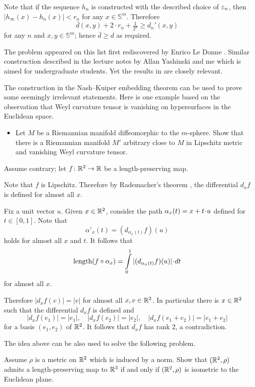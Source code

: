 Note that if the sequence $h_n$ is constructed with the described choice of $\varepsilon_n$,
then $|h_\infty(x)-h_n(x)|<r_n$ for any $x\in\mathbb{S}^m$.
Therefore 
\[\bar d(x,y)+2\cdot r_n+\tfrac1{2^n}\ge d_n'(x,y)\] 
for any $n$ and $x,y\in \mathbb{S}^m$;
hence $\bar d\ge d$ as required. 
\qeds


The problem appeared 
on this list first rediscovered by Enrico Le Donne \cite[see][]{le-donne}.
Similar construction described in the lecture notes by Allan Yashinski and me \cite[see][]{petrunin-yashinsky} 
which is aimed for undergraduate students. 
Yet the results in \cite{petrunin-paths} are closely relevant.

The construction in the Nash--Kuiper embedding theorem
can be used to prove some seemingly irrelevant statements.
Here is one example based on the observation that Weyl curvature tensor 
is vanishing on hypersurfaces in the Euclidean space.
\begin{itemize}
\item Let $M$ be a Riemannian manifold diffeomorphic to the $m$-sphere. 
Show that there is a Riemannian manifold $M'$ arbitrary close to $M$ in Lipschitz metric and vanishing Weyl curvature tensor.
\end{itemize}


Assume contrary;
let $f\colon\mathbb{R}^2\to \mathbb{R}$ be a length-preserving map.

Note that $f$ is Lipschitz.
Therefore by Rademacher's theorem \cite[see][]{rademacher}, the differential $d_xf$ is defined for  almost all $x$.

Fix a unit vector $u$.
Given $x\in\mathbb{R}^2$,
consider the path $\alpha_x(t)\z=x+t\cdot u$ defined for $t\in [0,1]$.
Note that  
\[\alpha'_x(t)=(d_{\alpha_x(t)}f)(u)\]
holds for almost all $x$ and $t$.
It follows that 
\[\length(f\circ\alpha_x)=\int\limits_0^1 |(d_{\alpha_x(t)}f)(u)| \cdot dt\]
for almost all $x$.

Therefore $|d_xf(v)|=|v|$ for almost all $x,v\in\mathbb{R}^2$.
In particular there is $x\in\mathbb{R}^2$ such that the differential $d_xf$ is defined 
and 
\[|d_xf(e_1)|=|e_1|,
\quad
|d_xf(e_2)|=|e_2|,
\quad
|d_xf(e_1+e_2)|=|e_1+e_2|\]
for a basis $(e_1,e_2)$ of $\mathbb{R}^2$.
It follows that $d_xf$ has rank 2, a contradiction. \qeds 


The idea above can be also used to solve the following problem.

\begin{pr} Assume $\rho$ is a metric on $\mathbb{R}^2$ 
which is induced by a norm.
Show that $(\mathbb{R}^2,\rho)$ admits 
a length-preserving map
to $\mathbb{R}^3$ 
if and only if 
$(\mathbb{R}^2,\rho)$ is isometric to the Euclidean plane.
\end{pr}








